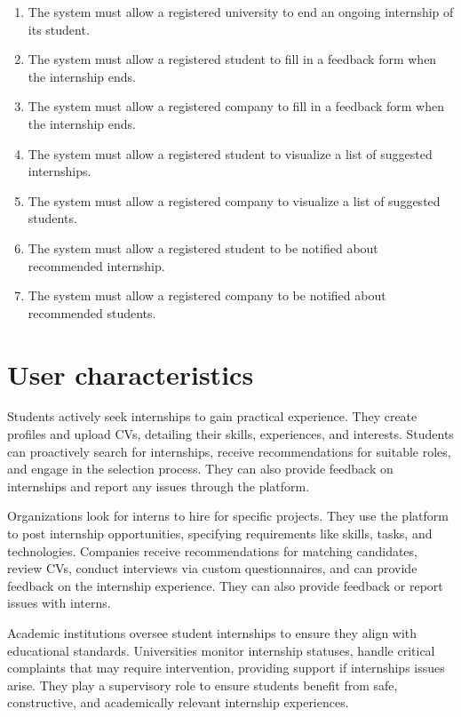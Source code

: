 \begin{enumerate}[label=\textbf{R\arabic* -}]
    \item The system must allow a registered university to end an ongoing internship of its student.
    \item The system must allow a registered student to fill in a feedback form when the internship ends.
    \item The system must allow a registered company to fill in a feedback form when the internship ends.
    \item The system must allow a registered student to visualize a list of suggested internships.
    \item The system must allow a registered company to visualize a list of suggested students.
    \item The system must allow a registered student to be notified about recommended internship.
    \item The system must allow a registered company to be notified about recommended students.
\end{enumerate}

\section{User characteristics}

Students actively seek internships to gain practical experience.
They create profiles and upload CVs, detailing their skills, experiences, and interests.
Students can proactively search for internships, receive recommendations for suitable roles, and engage in the selection process.
They can also provide feedback on internships and report any issues through the platform.

Organizations look for interns to hire for specific projects.
They use the platform to post internship opportunities, specifying requirements like skills, tasks, and technologies.
Companies receive recommendations for matching candidates, review CVs, conduct interviews via custom questionnaires, and can provide feedback on the internship experience.
They can also provide feedback or report issues with interns.

Academic institutions oversee student internships to ensure they align with educational standards.
Universities monitor internship statuses, handle critical complaints that may require intervention, providing support if internships issues arise.
They play a supervisory role to ensure students benefit from safe, constructive, and academically relevant internship experiences.

